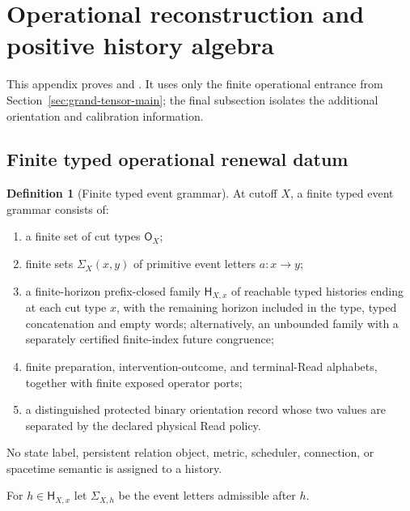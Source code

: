 \documentclass[11pt]{article}
\numberwithin{equation}{section}
\theoremstyle{definition}
\newtheorem{definition}[definition]{Definition}
\theoremstyle{remark}
\begin{document}
\section{Operational reconstruction and positive history algebra}
\label{supp:grand-reconstruction}

This appendix proves  and
. It uses only the finite
operational entrance from Section~\ref{sec:grand-tensor-main}; the final
subsection isolates the additional orientation and calibration information.

\subsection{Finite typed operational renewal datum}

\begin{definition}[Finite typed event grammar]
\label{def:supp-event-grammar}
At cutoff $X$, a finite typed event grammar consists of:
\begin{enumerate}[label=\textup{(E\arabic*)},leftmargin=3em]
\item a finite set of cut types $\mathsf O_X$;
\item finite sets $\Sigma_X(x,y)$ of primitive event letters $a:x\to y$;
\item a finite-horizon prefix-closed family $\mathsf H_{X,x}$ of reachable
      typed histories ending at each cut type $x$, with the remaining horizon
      included in the type, typed concatenation and empty words; alternatively,
      an unbounded family with a separately certified finite-index future
      congruence;
\item finite preparation, intervention-outcome, and terminal-Read alphabets,
      together with finite exposed operator ports;
\item a distinguished protected binary orientation record whose two values are
      separated by the declared physical Read policy.
\end{enumerate}
No state label, persistent relation object, metric, scheduler, connection, or
spacetime semantic is assigned to a history.
\end{definition}

For $h\in\mathsf H_{X,x}$ let $\Sigma_{X,h}$ be the event letters admissible
after $h$.
\end{document}
